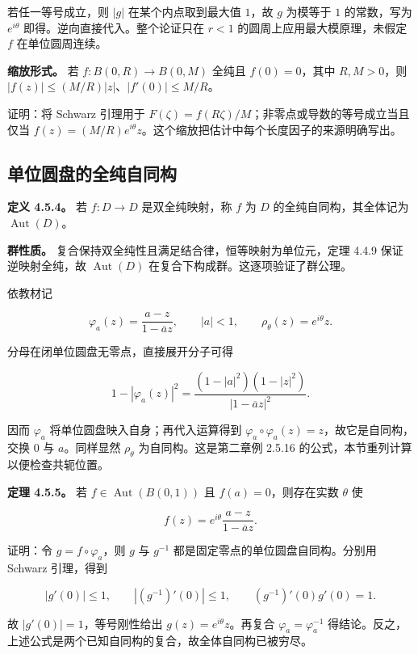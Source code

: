 \documentclass[11pt,a4paper]{article}
\begin{document}
若任一等号成立，则 \(|g|\) 在某个内点取到最大值 \(1\)，故 \(g\) 为模等于
\(1\) 的常数，写为 \(e^{i\theta}\) 即得。逆向直接代入。整个论证只在
\(r<1\) 的圆周上应用最大模原理，未假定 \(f\) 在单位圆周连续。

\textbf{缩放形式。} 若 \(f:B(0,R)\to B(0,M)\) 全纯且 \(f(0)=0\)，其中
\(R,M>0\)，则 \(|f(z)|\le(M/R)|z|\)、\(|f'(0)|\le M/R\)。

证明：将 Schwarz 引理用于
\(F(\zeta)=f(R\zeta)/M\)；非零点或导数的等号成立当且仅当
\(f(z)=(M/R)e^{i\theta}z\)。这个缩放把估计中每个长度因子的来源明确写出。

\subsection{单位圆盘的全纯自同构}\label{ch04-s5-heading-3}

\textbf{定义 4.5.4。} 若 \(f:D\to D\) 是双全纯映射，称 \(f\) 为 \(D\)
的全纯自同构，其全体记为 \(\operatorname{Aut}(D)\)。

\textbf{群性质。} 复合保持双全纯性且满足结合律，恒等映射为单位元，定理
4.4.9 保证逆映射全纯，故 \(\operatorname{Aut}(D)\)
在复合下构成群。这逐项验证了群公理。

依教材记

\[
\varphi_a(z)=\frac{a-z}{1-\overline a z},\qquad |a|<1,
\qquad \rho_\theta(z)=e^{i\theta}z.
\]

分母在闭单位圆盘无零点，直接展开分子可得

\[
1-|\varphi_a(z)|^2
=\frac{(1-|a|^2)(1-|z|^2)}{|1-\overline a z|^2}.
\]

因而 \(\varphi_a\) 将单位圆盘映入自身；再代入运算得到
\(\varphi_a\circ\varphi_a(z)=z\)，故它是自同构，交换 \(0\) 与
\(a\)。同样显然 \(\rho_\theta\) 为自同构。这是第二章例 2.5.16
的公式，本节重列计算以便检查共轭位置。

\textbf{定理 4.5.5。} 若 \(f\in\operatorname{Aut}(B(0,1))\) 且
\(f(a)=0\)，则存在实数 \(\theta\) 使

\[
f(z)=e^{i\theta}\frac{a-z}{1-\overline a z}.
\]

证明：令 \(g=f\circ\varphi_a\)，则 \(g\) 与 \(g^{-1}\)
都是固定零点的单位圆盘自同构。分别用 Schwarz 引理，得到

\[
|g'(0)|\le1,\qquad |(g^{-1})'(0)|\le1,
\qquad (g^{-1})'(0)g'(0)=1.
\]

故 \(|g'(0)|=1\)，等号刚性给出 \(g(z)=e^{i\theta}z\)。再复合
\(\varphi_a=\varphi_a^{-1}\)
得结论。反之，上述公式是两个已知自同构的复合，故全体自同构已被穷尽。
\end{document}
